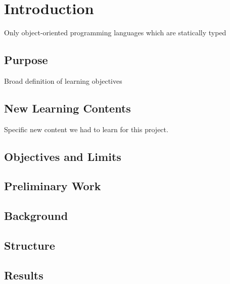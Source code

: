 \chapter{Introduction}
Only object-oriented programming languages which are statically typed

\section{Purpose}
Broad definition of learning objectives

\section{New Learning Contents}
Specific new content we had to learn for this project.

\section{Objectives and Limits}

\section{Preliminary Work}

\section{Background}

\section{Structure}

\section{Results}
